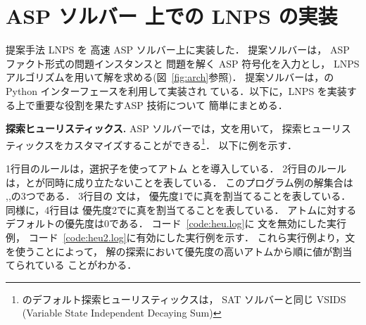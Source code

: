 \section{ASP ソルバー 上での LNPS の実装}

提案手法 LNPS を 高速 ASP ソルバー{\clingo}上に実装した．
提案ソルバーは，
ASP ファクト形式の問題インスタンスと
問題を解く ASP 符号化を入力とし，
LNPS アルゴリズムを用いて解を求める(図~\ref{fig:arch}参照)．
%
提案ソルバーは，{\clingo}の Python インターフェースを利用して実装され
ている．以下に，LNPS を実装する上で重要な役割を果たすASP 技術について
簡単にまとめる．

\textbf{探索ヒューリスティックス.}
ASP ソルバー{\clingo}では，文を用いて，
探索ヒューリスティックスをカスタマイズすることができる\footnote{%
{\clingo}のデフォルト探索ヒューリスティックスは，
SAT ソルバーと同じ VSIDS (Variable State Independent Decaying Sum)}．
以下に例を示す．





1行目のルールは，選択子を使ってアトム
とを導入している．
2行目のルールは，とが同時に成り立たないことを表している．
このプログラム例の解集合は
\code{\{\}},,の3つである．
3行目の 文は，
優先度1でに真を割当てることを表している．
同様に，4行目は
優先度2でに真を割当てることを表している．
アトムに対するデフォルトの優先度は0である．
%
コード~\ref{code:heu.log}に 文を無効にした実行例，
コード~\ref{code:heu2.log}に有効にした実行例を示す．
これら実行例より，文を使うことによって，
解の探索において優先度の高いアトムから順に値が割当てられている
ことがわかる．

